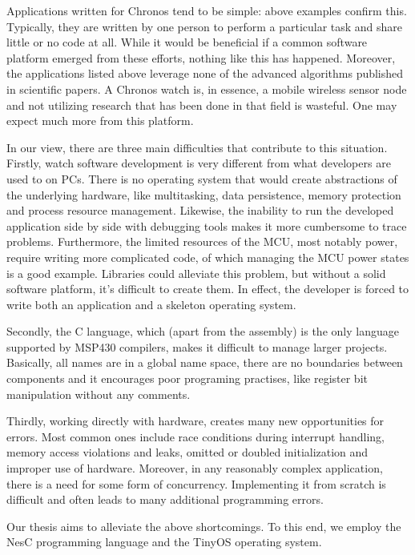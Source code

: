 Applications written for Chronos tend to be simple: above examples
confirm this. Typically, they are written by one person to perform a
particular task and share little or no code at all.  While it would be
beneficial if a common software platform emerged from these efforts,
nothing like this has happened. Moreover, the applications listed
above leverage none of the advanced algorithms published in
scientific papers. A Chronos watch is, in essence, a mobile wireless
sensor node and not utilizing research that has been done in
that field is wasteful. One may expect much more from this platform.

In our view, there are three main difficulties that contribute to this
situation.  Firstly, watch software development is very different from
what developers are used to on PCs. There is no operating system
that would create abstractions of the underlying hardware, like
multitasking, data persistence, memory protection and process resource
management.  Likewise, the inability to run the developed application side by
side with debugging tools makes it more cumbersome to trace problems.
Furthermore, the limited resources of the MCU, most notably power, require writing more
complicated code, of which managing the MCU power states is a good example.
Libraries could alleviate this problem, but without a solid software
platform, it's difficult to create them. In effect, the developer is forced
to write both an application and a skeleton operating system.

Secondly, the C language, which (apart from the assembly) is the only
language supported by MSP430 compilers, makes it difficult to
manage larger projects. Basically, all names are in a global name
space, there are no boundaries between components and it encourages
poor programing practises, like register bit manipulation without any
comments.

Thirdly, working directly with hardware, creates many new
opportunities for errors. Most common ones include race conditions during
interrupt handling, memory access violations and leaks, omitted or
doubled initialization and improper use of hardware.  Moreover, in any
reasonably complex application, there is a need for some form of
concurrency.  Implementing it from scratch is difficult and often
leads to many additional programming errors.

Our thesis aims to alleviate the above shortcomings. To this end, we
employ the NesC programming language and the TinyOS operating system.



